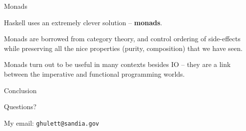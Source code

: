%
\begin{frame}[fragile]{Monads}

Haskell uses an extremely clever solution -- \textbf{monads}.

Monads are borrowed from category theory, and control ordering of side-effects
while preserving all the nice properties (purity, composition) that we have
seen.

Monads turn out to be useful in many contexts besides IO -- they are a link
between the imperative and functional programming worlds.

\end{frame}

%
\begin{frame}{Conclusion}

Questions?

My email: \texttt{ghulett@sandia.gov}

\end{frame}
